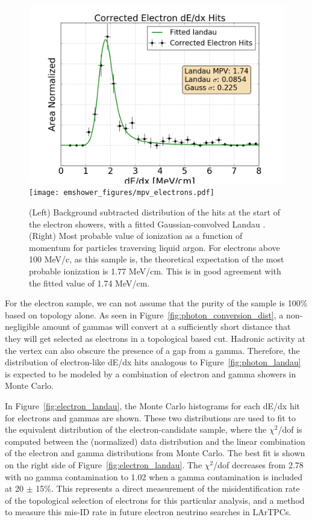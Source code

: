 \begin{figure}[p]
  \centering
  \includegraphics[width=\textwidth]{emshower_figures/fitted_electron_landau.png}
  \texttt{[image: emshower\_figures/mpv\_electrons.pdf]}
  \caption[Electron Landau Distribution]{(Left) Background subtracted distribution of the hits at the start of the electron showers, with a fitted Gaussian-convolved Landau .  (Right) Most probable value of ionization as a function of momentum for particles traversing liquid argon.  For electrons above 100 MeV/c, as this sample is, the theoretical expectation of the most probable ionization is 1.77 MeV/cm.  This is in good agreement with the fitted value of 1.74 MeV/cm.}
  \label{fig:mpv_electrons}
 \end{figure} 



For the electron sample, we can not assume that the purity of the sample is 100\% based on topology alone.  As seen in Figure~\ref{fig:photon_conversion_dist}, a non-negligible amount of gammas will convert at a sufficiently short distance that they will get selected as electrons in a topological based cut.  Hadronic activity at the vertex can also obscure the presence of a gap from a gamma.  Therefore, the distribution of electron-like dE/dx hits analogous to Figure~\ref{fig:photon_landau} is expected to be modeled by a combination of electron and gamma showers in Monte Carlo.

In Figure~\ref{fig:electron_landau}, the Monte Carlo histograms for each dE/dx hit for electrons and gammas are shown.  These two distributions are used to fit to the equivalent distribution of the electron-candidate sample, where the $\chi^2$/dof is computed between the (normalized) data distribution and the linear combination of the electron and gamma distributions from Monte Carlo.  The best fit is shown on the right side of Figure~\ref{fig:electron_landau}.  The $\chi^2$/dof decreases from 2.78 with no gamma contamination to 1.02 when a gamma contamination is included at 20 $\pm$ 15\%.  This represents a direct measurement of the misidentification rate of the topological selection of electrons for this particular analysis, and a method to measure this mis-ID rate in future electron neutrino searches in LArTPCs.

